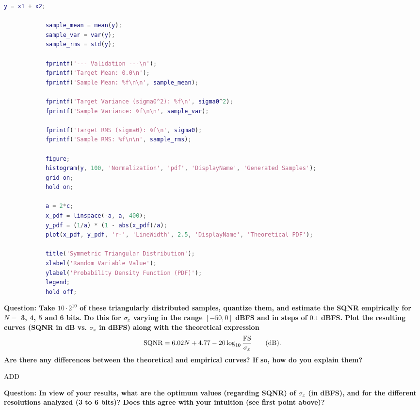 \documentclass[11pt,a4paper]{article}
\begin{document}
\begin{itemize}
\begin{lstlisting}[language=Matlab]
            y = x1 + x2;

            sample_mean = mean(y);
            sample_var = var(y);
            sample_rms = std(y);

            fprintf('--- Validation ---\n');
            fprintf('Target Mean: 0.0\n');
            fprintf('Sample Mean: %f\n\n', sample_mean);

            fprintf('Target Variance (sigma0^2): %f\n', sigma0^2);
            fprintf('Sample Variance: %f\n\n', sample_var);

            fprintf('Target RMS (sigma0): %f\n', sigma0);
            fprintf('Sample RMS: %f\n\n', sample_rms);

            figure;
            histogram(y, 100, 'Normalization', 'pdf', 'DisplayName', 'Generated Samples');
            grid on;
            hold on;

            a = 2*c;
            x_pdf = linspace(-a, a, 400);
            y_pdf = (1/a) * (1 - abs(x_pdf)/a);
            plot(x_pdf, y_pdf, 'r-', 'LineWidth', 2.5, 'DisplayName', 'Theoretical PDF');

            title('Symmetric Triangular Distribution');
            xlabel('Random Variable Value');
            ylabel('Probability Density Function (PDF)');
            legend;
            hold off;
        \end{lstlisting}
\end{itemize}

\vspace{1cm}
\textbf{Question: Take $10\cdot 2^{10}$ of these triangularly distributed samples, quantize them, and estimate the SQNR empirically
    for $N=$ 3, 4, 5 and 6 bits. Do this for $\sigma_x$ varying in the range $[-50, 0]$ dBFS and in steps of $0.1$ dBFS. Plot the
    resulting curves (SQNR in dB vs. $\sigma_x$ in dBFS) along with the theoretical expression
    \begin{equation}\label{eq:sqnr}
        {\rm SQNR} = 6.02 N + 4.77-20\log_{10}\frac{\rm FS}{\sigma_x} \qquad \mbox{(dB).}
    \end{equation}
    Are there any differences between the theoretical and empirical curves? If so, how do you explain them?}
\vspace{0.5cm}

ADD

\vspace{1cm}
\textbf{Question: In view of your results, what are the optimum values (regarding SQNR) of $\sigma_x$ (in dBFS), and for the different resolutions analyzed (3 to 6 bits)?
    Does this agree with your intuition (see first point above)?
}
\vspace{0.5cm}
\end{document}
